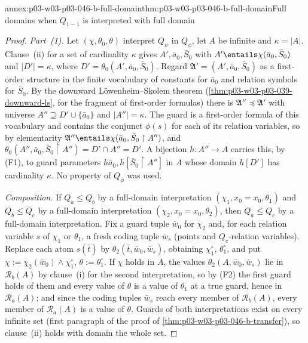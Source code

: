 \begin{annexitem}{annex:p03-w03-p03-046-b-full-domain}{thm:p03-w03-p03-046-b-full-domain}{Full domains when \(Q_{1-1}\) is interpreted with full domain}
\begin{proof}
\emph{Part~(1).} Let \((\chi,\theta_0,\theta)\) interpret \(Q_\psi\) in
\(Q_\phi\), let \(A\) be infinite and \(\kappa=|A|\). Clause~(ii) for a set
of cardinality \(\kappa\) gives \(A',\bar a_0,\bar S_0\) with
\(A'\entails\chi(\bar a_0,\bar S_0)\) and \(|D'|=\kappa\), where
\(D'=\theta_0(A',\bar a_0,\bar S_0)\). Regard \(\mathfrak A'=(A',\bar
a_0,\bar S_0)\) as a first-order structure in the finite vocabulary of
constants for \(\bar a_0\) and relation symbols for \(\bar S_0\). By the
downward L\"owenheim--Skolem theorem
(\cref{thm:p03-w03-p03-039-downward-ls}, for the fragment of first-order
formulas) there is \(\mathfrak A''\preccurlyeq\mathfrak A'\) with universe
\(A''\supseteq D'\cup\{\bar a_0\}\) and \(|A''|=\kappa\). The guard is a
first-order formula of this vocabulary and contains the conjunct \(\phi(s)\)
for each of its relation variables, so by elementarity
\(\mathfrak A''\entails\chi(\bar a_0,\bar S_0\restriction A'')\), and
\(\theta_0(A'',\bar a_0,\bar S_0\restriction A'')=D'\cap A''=D'\). A
bijection \(h\colon A''\to A\) carries this, by (F1), to guard parameters
\(h\bar a_0,h[\bar S_0\restriction A'']\) in \(A\) whose domain
\(h[D']\) has cardinality \(\kappa\). No property of \(Q_\phi\) was used.

\emph{Composition.} If \(Q_a\le Q_b\) by a full-domain interpretation
\((\chi_1,x_0=x_0,\theta_1)\) and \(Q_b\le Q_c\) by a full-domain
interpretation \((\chi_2,x_0=x_0,\theta_2)\), then \(Q_a\le Q_c\) by a
full-domain interpretation. Fix a guard tuple \(\bar w_0\) for
\(\chi_2\) and, for each relation variable \(s\) of \(\chi_1\) or
\(\theta_1\), a fresh coding tuple \(\bar w_s\) (points and \(Q_c\)-relation
variables). Replace each atom \(s(\bar t)\) by
\(\theta_2(\bar t,\bar w_0,\bar w_s)\), obtaining \(\chi_1^\circ\),
\(\theta_1^\circ\), and put \(\chi:=\chi_2(\bar w_0)\wedge\chi_1^\circ\),
\(\theta:=\theta_1^\circ\). If \(\chi\) holds in \(A\), the values
\(\theta_2(A,\bar w_0,\bar w_s)\) lie in \(\mathscr R_b(A)\) by clause~(i)
for the second interpretation, so by (F2) the first guard holds of them and
every value of \(\theta\) is a value of \(\theta_1\) at a true guard, hence in
\(\mathscr R_a(A)\); and since the coding tuples \(\bar w_s\) reach every
member of \(\mathscr R_b(A)\), every member of \(\mathscr R_a(A)\) is a value
of \(\theta\). Guards of both interpretations exist on every infinite set
(first paragraph of the proof of \cref{thm:p03-w03-p03-046-b-transfer}), so
clause~(ii) holds with domain the whole set.


\end{proof}
\end{annexitem}
